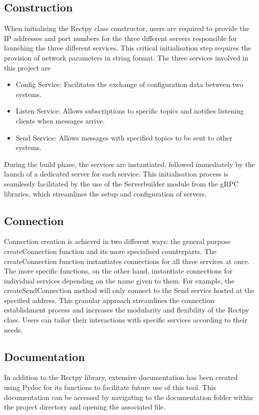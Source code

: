 \subsection{Construction}
When initialising the Rectpy class constructor, users are required to provide the IP addresses and port numbers for the three different servers responsible for launching the three different services. This critical initialisation step requires the provision of network parameters in string format. The three services involved in this project are

\begin{itemize}
  \item{Config Service:} Facilitates the exchange of configuration data between two systems.
  \item{Listen Service:} Allows subscriptions to specific topics and notifies listening clients when messages arrive.
  \item{Send Service:} Allows messages with specified topics to be sent to other systems.
\end{itemize}

During the build phase, the services are instantiated, followed immediately by the launch of a dedicated server for each service. This initialisation process is seamlessly facilitated by the use of the Serverbuilder module from the gRPC libraries, which streamlines the setup and configuration of servers.

\subsection{Connection}

Connection creation is achieved in two different ways: the general purpose createConnection function and its more specialised counterparts. The createConnection function instantiates connections for all three services at once. The more specific functions, on the other hand, instantiate connections for individual services depending on the name given to them. For example, the createSendConnection method will only connect to the Send service hosted at the specified address. This granular approach streamlines the connection establishment process and increases the modularity and flexibility of the Rectpy class. Users can tailor their interactions with specific services according to their needs.

\subsection{Documentation}
In addition to the Rectpy library, extensive documentation has been created using Pydoc for its functions to facilitate future use of this tool. This documentation can be accessed by navigating to the documentation folder within the project directory and opening the associated file. 

\filbreak
